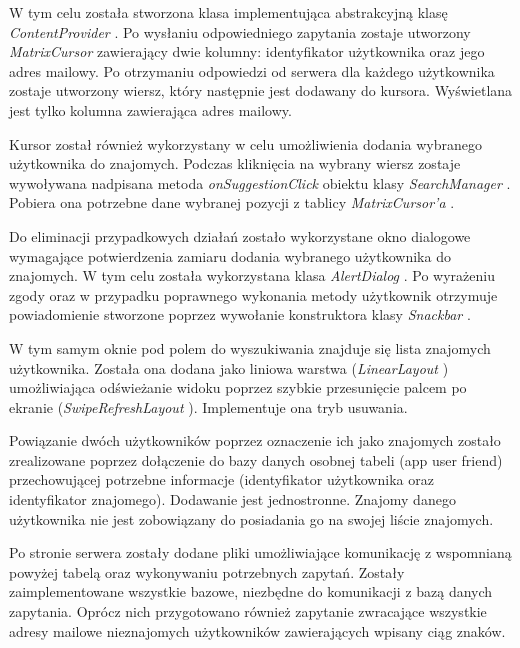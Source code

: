 \documentclass[10pt,twoside,a4paper]{report}
\begin{document}
\par W tym celu została stworzona klasa implementująca abstrakcyjną klasę \textit{ContentProvider} \cite{ContentProvider}. Po wysłaniu odpowiedniego zapytania zostaje utworzony \textit{MatrixCursor} \cite{MatrixCursor} zawierający dwie kolumny: identyfikator użytkownika oraz jego adres mailowy. Po otrzymaniu odpowiedzi od serwera dla każdego użytkownika zostaje utworzony wiersz, który następnie jest dodawany do kursora. Wyświetlana jest tylko kolumna zawierająca adres mailowy.

\par Kursor został również wykorzystany w celu umożliwienia dodania wybranego użytkownika do znajomych. Podczas kliknięcia na wybrany wiersz zostaje wywoływana nadpisana metoda \textit{onSuggestionClick} obiektu klasy \textit{SearchManager} \cite{SearchManager}. Pobiera ona potrzebne dane wybranej pozycji z tablicy \textit{MatrixCursor’a} \cite{MatrixCursor}.

\par Do eliminacji przypadkowych działań zostało wykorzystane okno dialogowe wymagające potwierdzenia  zamiaru dodania wybranego użytkownika do znajomych. W tym celu została wykorzystana klasa \textit{AlertDialog} \cite{AlertDialog}. Po wyrażeniu zgody  oraz w przypadku poprawnego wykonania metody użytkownik otrzymuje powiadomienie stworzone poprzez wywołanie konstruktora klasy \textit{Snackbar} \cite{Snackbar}.

\par W tym samym oknie pod polem do wyszukiwania znajduje się lista znajomych użytkownika. Została ona dodana jako liniowa warstwa (\textit{LinearLayout} \cite{LinearLayout}) umożliwiająca odświeżanie widoku poprzez szybkie przesunięcie palcem po ekranie (\textit{SwipeRefreshLayout} \cite{SwipeRefreshLayout}). Implementuje ona tryb usuwania.

\par Powiązanie dwóch użytkowników poprzez oznaczenie ich jako znajomych zostało zrealizowane poprzez dołączenie do bazy danych osobnej tabeli (app user friend)  przechowującej potrzebne informacje (identyfikator użytkownika oraz identyfikator znajomego). Dodawanie jest jednostronne. Znajomy danego użytkownika nie jest zobowiązany do posiadania go na swojej liście znajomych.

\par Po stronie serwera zostały dodane pliki umożliwiające komunikację z wspomnianą powyżej tabelą oraz wykonywaniu potrzebnych zapytań. Zostały zaimplementowane wszystkie bazowe, niezbędne do komunikacji z bazą danych zapytania. Oprócz nich przygotowano również zapytanie zwracające wszystkie adresy mailowe nieznajomych użytkowników zawierających wpisany ciąg znaków.
\end{document}
